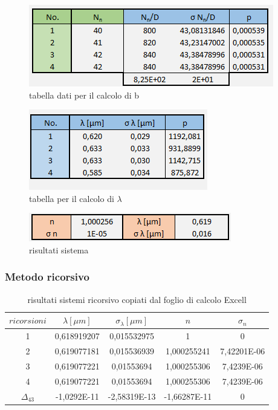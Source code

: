 \documentclass{article}
\begin{document}
\begin{figure}[h!]
  \centering
  \includegraphics[width=0.6\linewidth]{IM tabella b}
  \caption{tabella dati per il calcolo di b}
\end{figure}

\begin{figure}[h!]
  \centering
  \includegraphics[width=0.4\linewidth]{IM tabella lambda sistema}
  \caption{tabella per il calcolo di $\lambda$}
\end{figure}

\begin{figure}[h!]
  \centering
  \includegraphics[width=0.6\linewidth]{IM risultati sistema}
  \caption{risultati sistema}
\end{figure}

\subsubsection{Metodo ricorsivo}

\begin{table}[h!]
\centering
\begin{tabular}{ | c | c | c | c | c | }
\hline
 $ricorsioni$ & $\lambda [\mu m]$ & $\sigma_\lambda [\mu m]$ & $n$ & $\sigma_n$\\
\hline
 1 & 0,618919207 & 0,015532975 & 1 & 0\\
 2 & 0,619077181 & 0,015536939 & 1,000255241 & 7,42201E-06\\
 3 & 0,619077221 & 0,01553694 & 1,000255306 & 7,4239E-06\\
 4 & 0,619077221 & 0,01553694 & 1,000255306 & 7,4239E-06\\
\hline
 $\Delta_{4 3}$ & -1,0292E-11 & -2,58319E-13 & -1,66287E-11 & 0\\
\hline
\end{tabular}
\caption{risultati sistemi ricorsivo copiati dal foglio di calcolo Excell}
\label{table:6}
\end{table}
\end{document}
